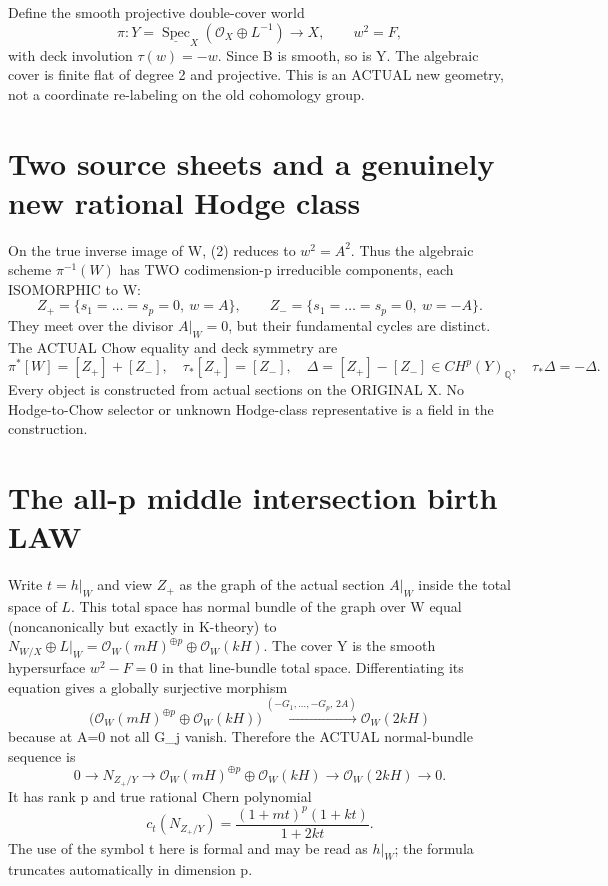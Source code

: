 \documentclass[11pt]{article}
\newcommand{\Q}{\mathbb Q}
\newcommand{\OO}{\mathcal O}
\begin{document}
Define the smooth projective double-cover world
\[
 \boxed{
 \pi:Y=\underline{\operatorname{Spec}}_X
       (\OO_X\oplus L^{-1})\longrightarrow X,\qquad
                  w^2=F,
 }                                                        \tag{3}
\]
with deck involution \(\tau(w)=-w\).
Since B is smooth, so is Y. The algebraic cover is
finite flat of degree 2 and projective.
This is an ACTUAL new geometry, not a coordinate
re-labeling on the old cohomology group.

\section{Two source sheets and a genuinely new rational Hodge class}
On the true inverse image of W, (2) reduces to
\(w^2=A^2\). Thus the algebraic scheme \(\pi^{-1}(W)\)
has TWO codimension-p irreducible components,
each ISOMORPHIC to W:
\[
 Z_+=\{s_1=\dots=s_p=0,\ w=A\},\qquad
 Z_-=\{s_1=\dots=s_p=0,\ w=-A\}.
\]
They meet over the divisor \(A|_W=0\), but their
fundamental cycles are distinct.
The ACTUAL Chow equality and deck symmetry are
\[
 \boxed{
 \pi^*[W]=[Z_+]+[Z_-],\quad
 \tau_*[Z_+]=[Z_-],\quad
 \Delta=[Z_+]-[Z_-]\in CH^p(Y)_{\Q},
 \quad\tau_*\Delta=-\Delta.
 }                                                        \tag{4}
\]
Every object is constructed from actual sections
on the ORIGINAL X. No Hodge-to-Chow selector or
unknown Hodge-class representative is a field
in the construction.

\section{The all-p middle intersection birth LAW}
Write \(t=h|_W\) and view \(Z_+\) as the graph
of the actual section \(A|_W\) inside the
total space of \(L\).
This total space has normal bundle of the graph
over W equal (noncanonically but exactly in K-theory)
to
\(N_{W/X}\oplus L|_W
 =\OO_W(mH)^{\oplus p}\oplus\OO_W(kH)\).
The cover Y is the smooth hypersurface
\(w^2-F=0\) in that line-bundle total space.
Differentiating its equation gives a globally
surjective morphism
\[
 \bigl(\OO_W(mH)^{\oplus p}\oplus\OO_W(kH)\bigr)
       \xrightarrow{(-G_1,\dots,-G_p,\,2A)}
     \OO_W(2kH)
\]
because at A=0 not all G_j vanish.
Therefore the ACTUAL normal-bundle sequence is
\[
 0\to N_{Z_+/Y}\to
      \OO_W(mH)^{\oplus p}\oplus\OO_W(kH)
     \to\OO_W(2kH)\to0.
                                                               \tag{5}
\]
It has rank p and true rational Chern polynomial
\[
 \boxed{
 c_t(N_{Z_+/Y})=
             \frac{(1+mt)^p(1+kt)}{1+2kt}.
 }                                                        \tag{6}
\]
The use of the symbol t here is formal
and may be read as \(h|_W\);
the formula truncates automatically in dimension p.
\end{document}
